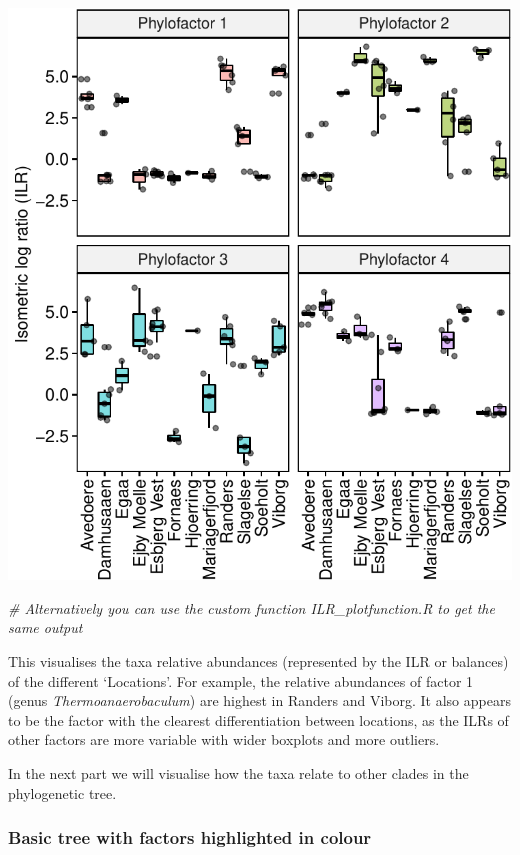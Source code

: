 \documentclass[
]{book}
\newenvironment{Shaded}{\begin{snugshade}}{\end{snugshade}}
\newcommand{\CommentTok}[1]{\textcolor[rgb]{0.56,0.35,0.01}{\textit{#1}}}
\begin{document}
\includegraphics{gitbook-demo_files/figure-latex/pfviz1-1.pdf}

\begin{Shaded}
\begin{Highlighting}[]
\CommentTok{\# Alternatively you can use the custom function \textasciigrave{}ILR\_plotfunction.R\textasciigrave{} to get  the same output}
\end{Highlighting}
\end{Shaded}

This visualises the taxa relative abundances (represented by the ILR or balances) of the different `Locations'. For example, the relative abundances of factor 1 (genus \emph{Thermoanaerobaculum}) are highest in Randers and Viborg. It also appears to be the factor with the clearest differentiation between locations, as the ILRs of other factors are more variable with wider boxplots and more outliers.

In the next part we will visualise how the taxa relate to other clades in the phylogenetic tree.

\hypertarget{basic-tree-with-factors-highlighted-in-colour}{%
\subsubsection{Basic tree with factors highlighted in colour}\label{basic-tree-with-factors-highlighted-in-colour}}
\end{document}
